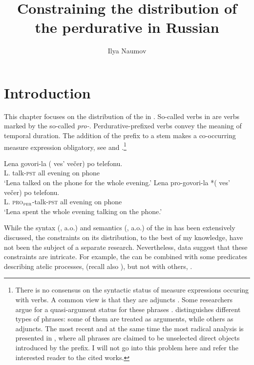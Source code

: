 \documentclass[output=paper,colorlinks,citecolor=brown,newtxmath]{langsci/langscibook}
\author{Ilya Naumov\affiliation{National Research University Higher School of Economics}}
\title{Constraining the distribution of the perdurative in Russian}
\begin{document}
%
\maketitle

\section{Introduction} \label{sec:naumov:1}
This chapter focuses on the distribution of the  in . So-called  verbs in  are verbs marked by the so-called  \textit{pro-}. Perdurative-prefixed verbs convey the meaning of temporal duration. The addition of the prefix to a  stem makes a co-occurring measure expression obligatory, see  and .\footnote{There is no consensus on the syntactic status of measure expressions occuring with  verbs. A common view is that they are adjuncts \citep[a.o.]{borik2006aspect,ramchand2008verb,gehrke2008ps}. Some researchers argue for a quasi-argument status for these phrases \citep{fowler1993argument}. \citet{schoorlemmer1995participial} distinguishes different types of  phrases: some of them are treated as arguments, while others as adjuncts. The most recent and at the same time the most radical analysis is presented in \citet{Žaucer2009vp,Žaucer2012syntax}, where all  phrases are claimed to be unselected direct objects introduced by the prefix. I will not go into this problem here and refer the interested reader to the cited works.}

\ea \ea \label{ex:naumov:1}
\gll Lena	govori-la	(\hspace{-2pt} ves’	večer)		po	telefonu.\\
     L.	talk-\textsc{pst} {} all	evening	on	phone\\
\glt `Lena talked on the phone for the whole evening.'
\ex\gll Lena pro-govori-la *(\hspace{-2pt} ves' večer)		po telefonu.\\
     L. \textsc{pro}$_{\textsc{per}}$-talk-\textsc{pst} {} all	evening	on	phone\\
\glt `Lena spent the whole evening talking on the phone.'\label{ex:naumov:1b}
\z \z

\noindent While the syntax (\citealt{babko1999zero,ramchand2005time,svenonius2004slavic,romanova2007constructing,gehrke2008ps,Žaucer2009vp,tolskaya2015verbal}, a.o.) and semantics (\citealt{isacenko1960grammaticeskij,bondarko1967,forsyth1970grammar,flier1985scope,zalizniak2000,gehrke2003aspectual,filip2005measures}, a.o.) of the  in  has been extensively discussed, the constraints on its distribution, to the best of my knowledge, have not been the subject of a separate research. Nevertheless, data suggest that these constraints are intricate. For example, the  can be combined with some predicates describing atelic processes,  (recall also ), but not with others, .
\end{document}
